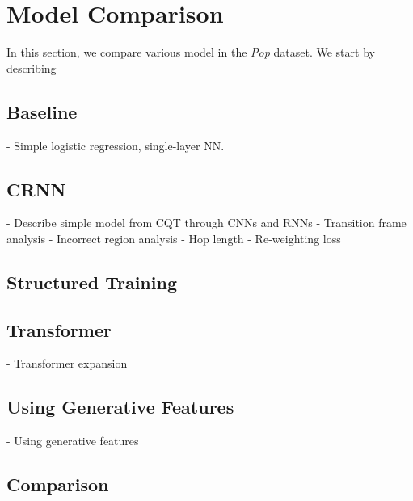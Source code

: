 \chapter{Model Comparison}

In this section, we compare various model in the \emph{Pop} dataset. We start by describing

\section{Baseline}

- Simple logistic regression, single-layer NN.

\section{CRNN}
- Describe simple model from CQT through CNNs and RNNs
- Transition frame analysis
- Incorrect region analysis
- Hop length
- Re-weighting loss

\section{Structured Training}

\section{Transformer}
- Transformer expansion

\section{Using Generative Features}
- Using generative features

\section{Comparison}